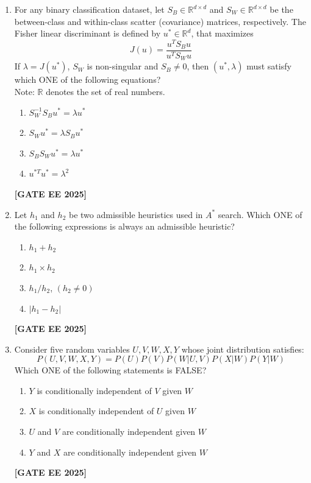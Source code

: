 \documentclass[journal]{IEEEtran}
\newcommand{\qfooter}{%
  \begin{flushright}\footnotesize\textbf{[GATE EE 2025]}\end{flushright}\vspace{1em}%
}
\begin{document}
\begin{enumerate}[leftmargin=*,label=\arabic*.]
\item For any binary classification dataset, let $S_B \in \mathbb{R}^{d \times d}$ and $S_W \in \mathbb{R}^{d \times d}$ be the between-class and within-class scatter (covariance) matrices, respectively. The Fisher linear discriminant is defined by $u^* \in \mathbb{R}^d$, that maximizes
\[
J(u) = \frac{u^T S_B u}{u^T S_W u}
\]
If $\lambda=J(u^*)$, $S_W$ is non-singular and $S_B \neq 0$, then $(u^*, \lambda)$ must satisfy which ONE of the following equations?\\
Note: $\mathbb{R}$ denotes the set of real numbers.
\begin{multicols}{2}
\begin{enumerate}[label=(\Alph*)]
\item $S_W^{-1} S_B u^* = \lambda u^*$
\item $S_W u^* = \lambda S_B u^*$
\item $S_B S_W u^* = \lambda u^*$
\item $u^{*T} u^* = \lambda^2$
\end{enumerate} \qfooter
\end{multicols}

\item Let $h_1$ and $h_2$ be two admissible heuristics used in $A^*$ search. Which ONE of the following expressions is always an admissible heuristic?
\begin{multicols}{2}
\begin{enumerate}[label=(\Alph*)]
\item $h_1 + h_2$
\item $h_1 \times h_2$
\item $h_1 / h_2$, $(h_2 \neq 0)$
\item $| h_1 - h_2 |$
\end{enumerate} \qfooter
\end{multicols}

\item Consider five random variables $U, V, W, X, Y$ whose joint distribution satisfies:
\[
P(U, V, W, X, Y) = P(U)P(V)P(W|U,V)P(X|W)P(Y|W)
\]
Which ONE of the following statements is FALSE?
\begin{multicols}{2}
\begin{enumerate}[label=(\Alph*)]
\item $Y$ is conditionally independent of $V$ given $W$
\item $X$ is conditionally independent of $U$ given $W$
\item $U$ and $V$ are conditionally independent given $W$
\item $Y$ and $X$ are conditionally independent given $W$
\end{enumerate} \qfooter
\end{multicols}


\end{enumerate}
\end{document}
